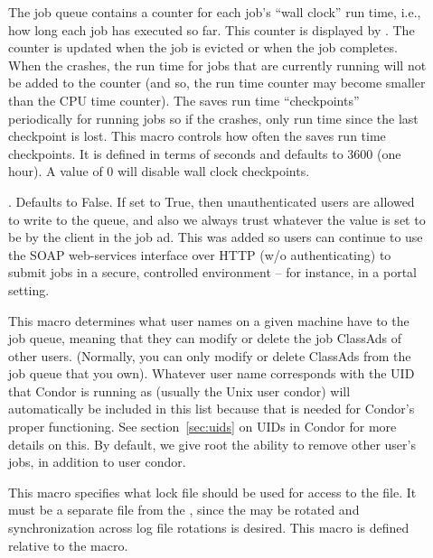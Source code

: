 \begin{description}
\item[] \label{param:WallClockCkptInterval}
  The job queue contains a counter for each job's ``wall clock'' run
  time, i.e., how long each job has executed so far.  This counter is
  displayed by .  The counter is updated when the job is
  evicted or when the job completes.  When the  crashes, the run
  time for jobs that are currently running will not be added to the
  counter (and so, the run time counter may become smaller than the
  CPU time counter).  The  saves run time ``checkpoints''
  periodically for running jobs so if the  crashes, only run
  time since the last checkpoint is lost.  This macro controls how
  often the  saves run time checkpoints.  It is defined in terms
  of seconds and defaults to 3600 (one hour).  A value of 0 will
  disable wall clock checkpoints.

\item[]. \label{param:QueueAllUsersTrusted}
  Defaults to False. If set to True, then unauthenticated users are allowed
  to write to the queue, and also we always trust whatever the 
  value is set to be by the client in the job ad. This was added so users
  can continue to use the SOAP web-services interface over HTTP (w/o
  authenticating) to submit jobs in a secure, controlled environment -- for
  instance, in a portal setting.
     
\item[] \label{param:QueueSuperUsers} This
  macro determines what user names on a given machine have
   to the job queue, meaning that they can
  modify or delete the job ClassAds of other users.  (Normally, you
  can only modify or delete ClassAds from the job queue that you own).
  Whatever user name corresponds with the UID that Condor is running as
  (usually the Unix user condor) will automatically be included in this list
  because that is needed for Condor's proper functioning.  See
  section~\ref{sec:uids} on UIDs in Condor for more details on
  this.  By default, we give root the ability to remove other
  user's jobs, in addition to user condor.
      
\item[] \label{param:ScheddLock} This macro
  specifies what lock file should be used for access to the
   file.  It must be a separate file from the
  , since the  may be rotated and
  synchronization across log file rotations
  is desired.
  This macro is defined relative to the  macro.


\end{description}
